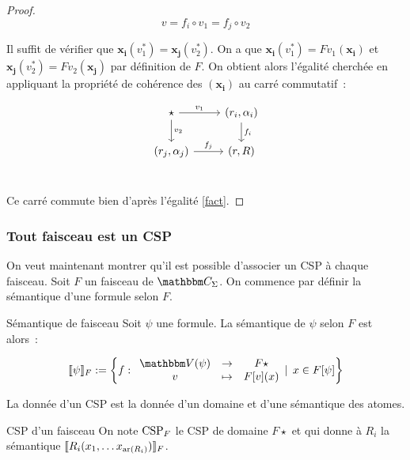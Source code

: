 \begin{proof}
    \begin{equation}\label{fact} v = f_i\circ v_1 = f_j\circ v_2 \end{equation}
    
    Il suffit de vérifier que $\mathbf{x_i}(v_1^*) = \mathbf{x_j}(v_2^*)$.
    On a que $\mathbf{x_i}(v_1^*) = Fv_1(\mathbf{x_i})$ et
    $\mathbf{x_j}(v_2^*) = Fv_2(\mathbf{x_j})$ par définition de $F$. On obtient alors
    l'égalité cherchée en appliquant la propriété de cohérence des $(\mathbf{x_i})$
    au carré commutatif~:

    \[\begin{tikzcd}
        \star \arrow[r, "v_1"] \arrow[d, "v_2"] & (r_i,\alpha_i) \arrow[d, "f_i"] \\
        (r_j,\alpha_j) \arrow[r, "f_j"] & (r,R) \\
    \end{tikzcd}\]

    Ce carré commute bien d'après l'égalité \ref{fact}.
\end{proof}

\subsubsection{Tout faisceau est un CSP}

On veut maintenant montrer qu'il est possible d'associer un CSP à chaque faisceau. Soit
$F$ un faisceau de $\C_\Sigma$. On commence par définir la sémantique d'une formule
selon $F$.

\begin{defi}{Sémantique de faisceau}
    Soit $\psi$ une formule. La sémantique de $\psi$ selon $F$ est alors~:

    \[ \sem{\psi}_F := \left\{ f:\begin{array}{ccc}
            \V(\psi) & \rightarrow & F\star \\
            v        & \mapsto     & F[v](x) \\
    \end{array}\Large|~x\in F[\psi] \right\}\]
\end{defi}

La donnée d'un CSP est la donnée d'un domaine et d'une sémantique des atomes.

\begin{defi}{CSP d'un faisceau}
    On note $\text{CSP}_F$ le CSP de domaine $F\star$ et qui donne à
    $R_i$ la sémantique $\llbracket {R_i(x_1, \dots x_{\text{ar}(R_i)})} \rrbracket_F$.
\end{defi}

